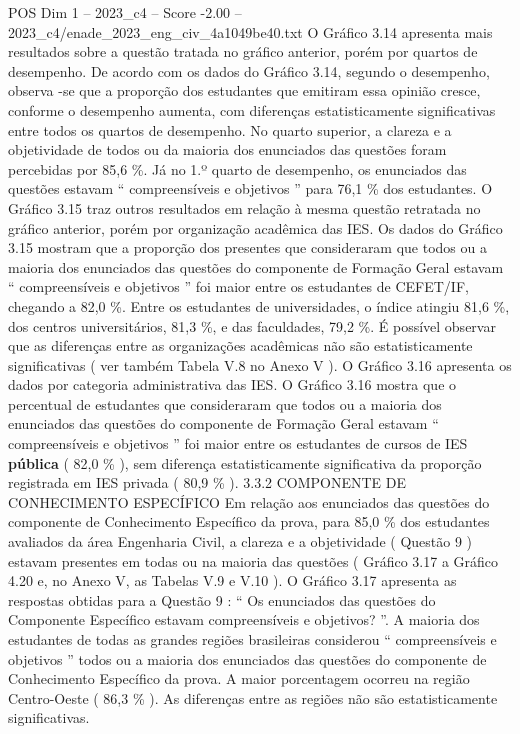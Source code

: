 \begin{textsample}{POS Dim 1 – 2023\_c4 – Score -2.00 – 2023\_c4/enade\_2023\_eng\_civ\_4a1049be40.txt}
O Gráfico 3.14 apresenta mais resultados sobre a questão tratada no gráfico anterior, porém por quartos de desempenho.
De acordo com os dados do Gráfico 3.14, segundo o desempenho, observa -se que a proporção dos estudantes que emitiram essa opinião cresce, conforme o desempenho aumenta, com diferenças estatisticamente significativas entre todos os quartos de desempenho.
No quarto superior, a clareza e a objetividade de todos ou da maioria dos enunciados das questões foram percebidas por 85,6 \%.
Já no 1.º quarto de desempenho, os enunciados das questões estavam “ compreensíveis e objetivos ” para 76,1 \% dos estudantes.
O Gráfico 3.15 traz outros resultados em relação à mesma questão retratada no gráfico anterior, porém por organização acadêmica das IES.
Os dados do Gráfico 3.15 mostram que a proporção dos presentes que consideraram que todos ou a maioria dos enunciados das questões do componente de Formação Geral estavam “ compreensíveis e objetivos ” foi maior entre os estudantes de CEFET/IF, chegando a 82,0 \%.
Entre os estudantes de universidades, o índice atingiu 81,6 \%, dos centros universitários, 81,3 \%, e das faculdades, 79,2 \%.
É possível observar que as diferenças entre as organizações acadêmicas não são estatisticamente significativas ( ver também Tabela V.8 no Anexo V ).
O Gráfico 3.16 apresenta os dados por categoria administrativa das IES.
O Gráfico 3.16 mostra que o percentual de estudantes que consideraram que todos ou a maioria dos enunciados das questões do componente de Formação Geral estavam “ compreensíveis e objetivos ” foi maior entre os estudantes de cursos de IES \textbf{pública} ( 82,0 \% ), sem diferença estatisticamente significativa da proporção registrada em IES privada ( 80,9 \% ). 3.3.2 COMPONENTE DE CONHECIMENTO ESPECÍFICO Em relação aos enunciados das questões do componente de Conhecimento Específico da prova, para 85,0 \% dos estudantes avaliados da área Engenharia Civil, a clareza e a objetividade ( Questão 9 ) estavam presentes em todas ou na maioria das questões ( Gráfico 3.17 a Gráfico 4.20 e, no Anexo V, as Tabelas V.9 e V.10 ).
O Gráfico 3.17 apresenta as respostas obtidas para a Questão 9 : “ Os enunciados das questões do Componente Específico estavam compreensíveis e objetivos? ”.
A maioria dos estudantes de todas as grandes regiões brasileiras considerou “ compreensíveis e objetivos ” todos ou a maioria dos enunciados das questões do componente de Conhecimento Específico da prova.
A maior porcentagem ocorreu na região Centro-Oeste ( 86,3 \% ).
As diferenças entre as regiões não são estatisticamente significativas.

\end{textsample}
